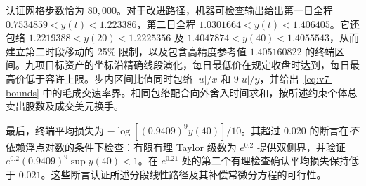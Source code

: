 \documentclass[11pt]{article}
\numberwithin{equation}{section}
\theoremstyle{definition}
\theoremstyle{remark}
\begin{document}
认证网格步数恰为 $80,000$。对于改进路径，机器可检查输出给出第一日全程 $0.7534859<y(t)<1.223386$，第二日全程 $1.0301664<y(t)<1.406405$。它还包络 $1.2219388<y(20)<1.2225356$ 及
$1.4047874<y(40)<1.4055543$，从而建立第二时段移动的 25\% 限制，以及包含高精度参考值 $1.405160822$ 的终端区间。九项目标资产的坐标沿精确线段演化，每日最低价在规定收盘时达到，每日最高价低于容许上限。步内区间比值同时包络 $|u|/x$ 和 $9|u|/y$，并给出~\eqref{eq:v7-bounds} 中的毛成交速率界。相同包络配合向外舍入时间求和，按所述约束个体总卖出股数及成交美元换手。

最后，终端平均损失为 $-\log[(0.9409)^9 y(40)]/10$。其超过 $0.020$ 的断言在\emph{不}依赖浮点对数的条件下检查：有限有理 Taylor 级数为 $e^{0.2}$ 提供双侧界，并验证 $e^{0.2}(0.9409)^9\sup y(40)<1$。在 $e^{0.21}$ 处的第二个有理检查确认平均损失保持低于 $0.021$。这些断言认证所述分段线性路径及其补偿常微分方程的可行性。



\end{document}
